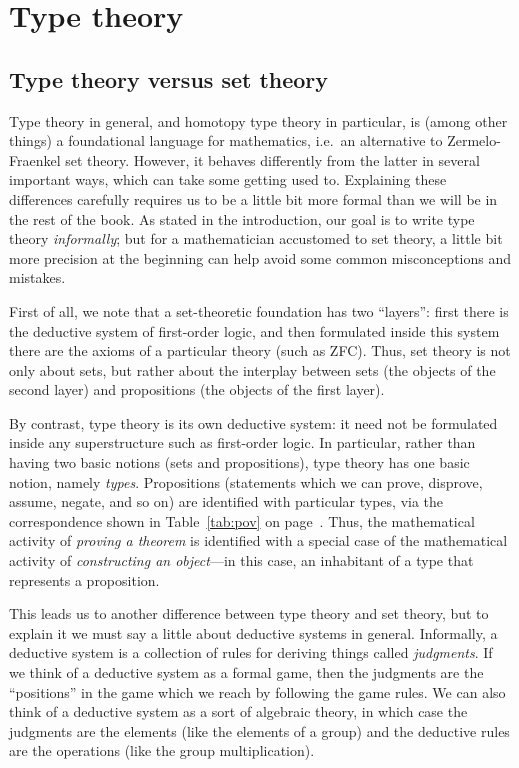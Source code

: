 \chapter{Type theory}
\label{cha:typetheory}

\section{Type theory versus set theory}
\label{sec:types-vs-sets}

Type theory in general, and homotopy type theory in particular, is (among other things) a foundational language for mathematics, i.e.\ an alternative to Zermelo-Fraenkel set theory.
However, it behaves differently from the latter in several important ways, which can take some getting used to.
Explaining these differences carefully requires us to be a little bit more formal than we will be in the rest of the book.
As stated in the introduction, our goal is to write type theory \emph{informally}; but for a mathematician accustomed to set theory, a little bit more precision at the beginning can help avoid some common misconceptions and mistakes.

First of all, we note that a set-theoretic foundation has two ``layers'': first there is the deductive system of first-order logic, and then formulated inside this system there are the axioms of a particular theory (such as ZFC).
Thus, set theory is not only about sets, but rather about the interplay between sets (the objects of the second layer) and propositions (the objects of the first layer).

By contrast, type theory is its own deductive system: it need not be formulated inside any superstructure such as first-order logic.
In particular, rather than having two basic notions (sets and propositions), type theory has one basic notion, namely \emph{types}.
Propositions (statements which we can prove, disprove, assume, negate, and so on) are identified with particular types, via the correspondence shown in Table~\ref{tab:pov} on page~\pageref{tab:pov}.
Thus, the mathematical activity of \emph{proving a theorem} is identified with a special case of the mathematical activity of \emph{constructing an object}---in this case, an inhabitant of a type that represents a proposition.

This leads us to another difference between type theory and set theory, but to explain it we must say a little about deductive systems in general.
Informally, a deductive system is a collection of rules for deriving things called \emph{judgments}.
If we think of a deductive system as a formal game, then the judgments are the ``positions'' in the game which we reach by following the game rules.
We can also think of a deductive system as a sort of algebraic theory, in which case the judgments are the elements (like the elements of a group) and the deductive rules are the operations (like the group multiplication).

